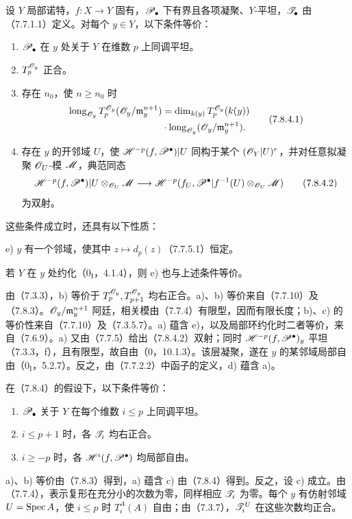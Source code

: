 设 $Y$ 局部诺特，$f:X\to Y$ 固有，$\mathscr P_\bullet$ 下有界且各项凝聚、$Y$-平坦，$\mathscr T_\bullet$ 由（7.7.1.1）定义。对每个 $y\in Y$，以下条件等价：
\begin{enumerate}[label=\alph*)]
\item $\mathscr P_\bullet$ 在 $y$ 处关于 $Y$ 在维数 $p$ 上同调平坦。
\item $T_p^{\mathscr O_y}$ 正合。
\item 存在 $n_0$，使 $n\geq n_0$ 时
\begin{equation}
 \begin{aligned}
 \operatorname{long}_{\mathscr O_y}T_p^{\mathscr O_y}(\mathscr O_y/\mathfrak m_y^{n+1})
 &=\dim_{k(y)}T_p^{\mathscr O_y}(k(y))\\
 &\cdot\operatorname{long}_{\mathscr O_y}(\mathscr O_y/\mathfrak m_y^{n+1}).
 \end{aligned}\tag{7.8.4.1}
\end{equation}
\item 存在 $y$ 的开邻域 $U$，使 $\mathscr H^{-p}(f,\mathscr P^\bullet)|U$ 同构于某个 $(\mathscr O_Y|U)^r$，并对任意拟凝聚 $\mathscr O_U$-模 $\mathscr M$，典范同态
\begin{equation}
 \mathscr H^{-p}(f,\mathscr P^\bullet)|U\otimes_{\mathscr O_U}\mathscr M
 \longrightarrow\mathscr H^{-p}(f_U,\mathscr P^\bullet|f^{-1}(U)\otimes_{\mathscr O_U}\mathscr M)
 \tag{7.8.4.2}
\end{equation}
为双射。
\end{enumerate}
这些条件成立时，还具有以下性质：

\noindent e) $y$ 有一个邻域，使其中 $z\mapsto d_p(z)$（7.7.5.1）恒定。

若 $Y$ 在 $y$ 处约化（$0_{\mathrm I}$，4.1.4），则 e) 也与上述条件等价。

由（7.3.3），b) 等价于 $T_p^{\mathscr O_y},T_{p+1}^{\mathscr O_y}$ 均右正合。a)、b) 等价来自（7.7.10）及（7.8.3）。$\mathscr O_y/\mathfrak m_y^{n+1}$ 阿廷，相关模由（7.7.4）有限型，因而有限长度；b)、c) 的等价性来自（7.7.10）及（7.3.5.7）。a) 蕴含 e)，以及局部环约化时二者等价，来自（7.6.9）。a) 又由（7.7.5）给出（7.8.4.2）双射；同时 $\mathscr H^{-p}(f,\mathscr P^\bullet)_y$ 平坦（7.3.3，f），且有限型，故自由（0，10.1.3）。该层凝聚，遂在 $y$ 的某邻域局部自由（$0_{\mathrm I}$，5.2.7）。反之，由（7.7.2.2）中函子的定义，d) 蕴含 a)。

在（7.8.4）的假设下，以下条件等价：
\begin{enumerate}[label=\alph*)]
\item $\mathscr P_\bullet$ 关于 $Y$ 在每个维数 $i\leq p$ 上同调平坦。
\item $i\leq p+1$ 时，各 $\mathscr T_i$ 均右正合。
\item $i\geq-p$ 时，各 $\mathscr H^i(f,\mathscr P^\bullet)$ 均局部自由。
\end{enumerate}
a)、b) 等价由（7.8.3）得到，a) 蕴含 c) 由（7.8.4）得到。反之，设 c) 成立。由（7.7.4），表示复形在充分小的次数为零，同样相应 $\mathscr T_i$ 为零。每个 $y$ 有仿射邻域 $U=\operatorname{Spec} A$，使 $i\leq p$ 时 $T_i^A(A)$ 自由；由（7.3.7），$\mathscr T_i^U$ 在这些次数均正合。

